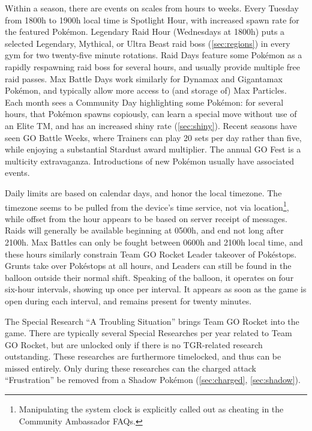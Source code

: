 Within a season, there are events on scales from hours to weeks.
Every Tuesday from 1800h to 1900h local time is Spotlight Hour, with
 increased spawn rate for the featured Pokémon.
Legendary Raid Hour (Wednesdays at 1800h) puts a selected Legendary, Mythical,
 or Ultra Beast raid boss (\autoref{sec:regions}) in every gym for two
 twenty-five minute rotations.
Raid Days feature some Pokémon as a rapidly respawning raid boss for several hours,
 and usually provide multiple free raid passes.
Max Battle Days work similarly for Dynamax and Gigantamax Pokémon, and typically
 allow more access to (and storage of) Max Particles.
Each month sees a Community Day highlighting some Pokémon: for several hours,
 that Pokémon spawns copiously, can learn a special move without use of an
 Elite TM, and has an increased shiny rate (\autoref{sec:shiny}).
Recent seasons have seen GO Battle Weeks, where Trainers can play 20 sets
 per day rather than five, while enjoying a substantial Stardust award multiplier.
The annual GO Fest is a multicity extravaganza.
Introductions of new Pokémon usually have associated events.

Daily limits are based on calendar days, and honor the local timezone.
The timezone seems to be pulled from the device's time service, not via location\footnote{Manipulating
 the system clock is explicitly called out as cheating in the Community Ambassador FAQs.},
 while offset from the hour appears to be based on server receipt of messages.
Raids will generally be available beginning at 0500h, and end not long after 2100h.
Max Battles can only be fought between 0600h and 2100h local time,
 and these hours similarly constrain Team GO Rocket Leader takeover of Pokéstops.
Grunts take over Pokéstops at all hours, and Leaders can still be found
 in the balloon outside their normal shift.
Speaking of the balloon, it operates on four six-hour intervals, showing up once per interval.
It appears as soon as the game is open during each interval, and remains present for twenty minutes.

The Special Research ``A Troubling Situation'' brings Team GO Rocket into the game.
There are typically several Special Researches per year related to Team GO Rocket,
 but are unlocked only if there is no TGR-related research outstanding.
These researches are furthermore timelocked, and thus can be missed entirely.
Only during these researches can the charged attack ``Frustration'' be removed
 from a Shadow Pokémon (\autoref{sec:charged}, \autoref{sec:shadow}).
